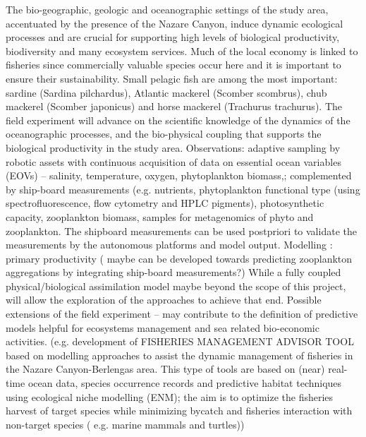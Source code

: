The bio-geographic, geologic and oceanographic settings of the study
area, accentuated by the presence of the Nazare Canyon, induce dynamic
ecological processes and are crucial for supporting high levels of
biological productivity, biodiversity and many ecosystem services. Much
of the local economy is linked to fisheries since commercially valuable
species occur here and it is important to ensure their
sustainability. Small pelagic fish are among the most important: sardine
(Sardina pilchardus), Atlantic mackerel (Scomber scombrus), chub
mackerel (Scomber japonicus) and horse mackerel (Trachurus trachurus).
The field experiment will advance on the scientific knowledge of the
dynamics of the oceanographic processes, and the bio-physical coupling
that supports the biological productivity in the study area.
Observations: adaptive sampling by robotic assets with continuous
acquisition of data on essential ocean variables (EOVs) – salinity,
temperature, oxygen, phytoplankton biomass,; complemented by ship-board
measurements (e.g. nutrients, phytoplankton functional type (using
spectrofluorescence, flow cytometry and HPLC pigments), photosynthetic
capacity, zooplankton biomass, samples for metagenomics of phyto and
zooplankton.  The shipboard measurements can be used postpriori to
validate the measurements by the autonomous platforms and model output.
Modelling : primary productivity ( maybe can be developed towards
predicting zooplankton aggregations by integrating ship-board
measurements?)  While a fully coupled physical/biological assimilation
model maybe beyond the scope of this project, \proj will allow the
exploration of the approaches to achieve that end.  Possible extensions
of the field experiment – may contribute to the definition of predictive
models helpful for ecosystems management and sea related bio-economic
activities. (e.g. development of FISHERIES MANAGEMENT ADVISOR TOOL based
on modelling approaches to assist the dynamic management of fisheries in
the Nazare Canyon-Berlengas area. This type of tools are based on (near)
real-time ocean data, species occurrence records and predictive habitat
techniques using ecological niche modelling (ENM); the aim is to
optimize the fisheries harvest of target species while minimizing
bycatch and fisheries interaction with non-target species ( e.g. marine
mammals and turtles))


